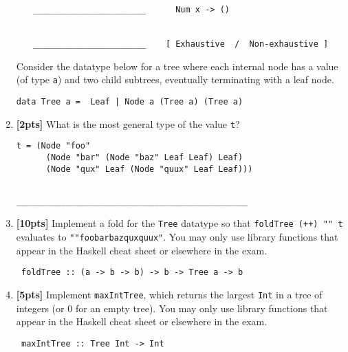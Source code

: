 \documentclass[paper=letter, fontsize=13pt]{article} %
\numberwithin{equation}{section} %
\newif\ifshowanswers\showanswersfalse
\begin{document}
\begin{enumerate}
\begin{enumerate}
{\begin{lstlisting}
_______________________      Num x -> ()


_______________________    [ Exhaustive  /  Non-exhaustive ]
\end{lstlisting}
  }
\bigskip
\bigskip
\bigskip

\end{enumerate}

\newpage
Consider the datatype below for a tree where each internal node has a value (of type \texttt{a}) and two child subtrees, eventually terminating
with a leaf node.  

\begin{verbatim}
data Tree a =  Leaf | Node a (Tree a) (Tree a)
\end{verbatim}

\item \textbf{[2pts]} What is the most general type of the value \texttt{t}?
\begin{verbatim}
t = (Node "foo"  
      (Node "bar" (Node "baz" Leaf Leaf) Leaf) 
      (Node "qux" Leaf (Node "quux" Leaf Leaf)))
\end{verbatim}

\ifshowanswers 
\texttt{Tree String} or \texttt{Tree Char}
\else
\begin{verbatim}

_______________________________________________
\end{verbatim}
\fi

\item \textbf{[10pts]} Implement a fold for the \texttt{Tree} datatype 
so that \texttt{foldTree (++) "" t} evaluates to \texttt{""foobarbazquxquux"}.
You may only use library functions that appear in the Haskell cheat sheet or elsewhere in the exam.
\begin{verbatim}
 foldTree :: (a -> b -> b) -> b -> Tree a -> b
\end{verbatim}    
\ifshowanswers
\begin{verbatim}
foldTree f d Leaf = d 
foldTree f d (Node v l r) = f v (foldTree f (foldTree f d r) l)
\end{verbatim}    
\else
\bigskip 
\bigskip 
\bigskip 
\bigskip 
\bigskip 
\bigskip 
\bigskip 
\bigskip 
\bigskip 
\bigskip 
\bigskip 
\bigskip 
\fi

\item \textbf{[5pts]} Implement \texttt{maxIntTree}, 
which returns the largest \texttt{Int} in a tree of integers (or 0 for an empty tree).
You may only use library functions that appear in the Haskell cheat sheet or elsewhere in the exam.
\begin{verbatim}
 maxIntTree :: Tree Int -> Int 
\end{verbatim}
\ifshowanswers
\begin{lstlisting}
maxIntTree = foldTree max 0
\end{lstlisting}
\else
\bigskip 
\bigskip 
\bigskip 
\bigskip 
\bigskip 
\bigskip 
\bigskip 
\bigskip 
\bigskip 
\bigskip 
\bigskip 
\fi


\end{enumerate}
\end{document}
